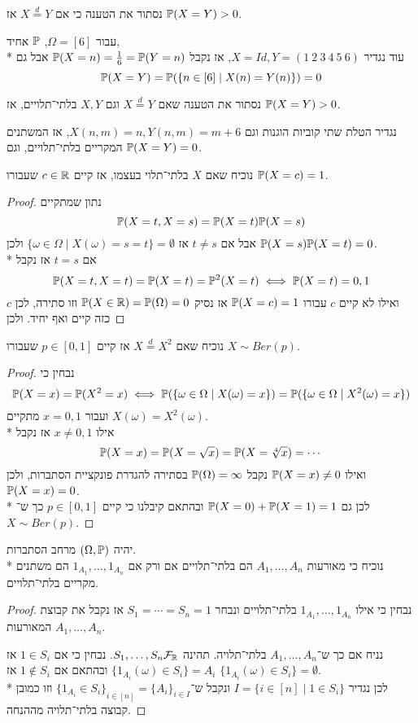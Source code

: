 \Subquestion{}
נסתור את הטענה כי אם $X \overset{d}{=} Y$ אז $\mathbb{P}(X = Y) > 0$.
\begin{solution}
	עבור $\Omega = [6]$, $\mathbb{P}$ אחיד, \\*
	עוד נגדיר $X = Id, Y = (1\ 2\ 3\ 4\ 5\ 6)$, אז נקבל $\mathbb{P}(X = n) = \frac{1}{6} = \mathbb{P}(Y = n)$ אבל גם
	\[
		\mathbb{P}(X = Y)
		= \mathbb{P}(\{n \in [6] \mid X(n) = Y(n)\})
		= 0
	\]
\end{solution}

\Subquestion{}
נסתור את הטענה שאם $X \overset{d}{=} Y$ וגם $X, Y$ בלתי־תלויים, אז $\mathbb{P}(X = Y) > 0$.
\begin{solution}
	נגדיר הטלת שתי קוביות הוגנות וגם $X(n, m) = n, Y(n, m) = m + 6$, אז המשתנים המקריים בלתי־תלויים, וגם $\mathbb{P}(X = Y) = 0$.
\end{solution}

\Subquestion{}
נוכיח שאם $X$ בלתי־תלוי בעצמו, אז קיים $c \in \mathbb{R}$ שעבורו $\mathbb{P}(X = c) = 1$.
\begin{proof}
	נתון שמתקיים
	\[
		\mathbb{P}(X = t, X = s) = \mathbb{P}(X = t) \mathbb{P}(X = s)
	\]
	אבל אם $t \ne s$ אז $\{ \omega \in \Omega \mid X(\omega) = s = t \} = \emptyset$ ולכן $\mathbb{P}(X = s) \mathbb{P}(X = t) = 0$. \\*
	אם $t = s$ אז נקבל
	\[
		\mathbb{P}(X = t, X = t) = \mathbb{P}(X = t) = \mathbb{P}^2(X = t)
		\iff
		\mathbb{P}(X = t) = 0, 1
	\]
	ואילו לא קיים $c$ עבורו $\mathbb{P}(X = c) = 1$ אז נסיק $\mathbb{P}(X \in \mathbb{R}) = \mathbb{P}(\Omega) = 0$ וזו סתירה, לכן $c$ כזה קיים ואף יחיד.
	ולכן 
\end{proof}

\Subquestion{}
נוכיח שאם $X \overset{d}{=} X^2$ אז קיים $p \in [0, 1]$ שעבורו $X \sim Ber(p)$.
\begin{proof}
	נבחין כי
	\[
		\mathbb{P}(X = x) = \mathbb{P}(X^2 = x)
		\iff
		\mathbb{P}(\{\omega \in \Omega \mid X(\omega) = x\}) = \mathbb{P}(\{\omega \in \Omega \mid X^2(\omega) = x\})
	\]
	ועבור $x = 0, 1$ מתקיים $X(\omega) = X^2(\omega)$. \\*
	אילו $x \ne 0, 1$ אז נקבל
	\[
		\mathbb{P}(X = x) = \mathbb{P}(X = \sqrt{x}) = \mathbb{P}(X = \sqrt[4]{x}) = \cdots
	\]
	ואילו $\mathbb{P}(X = x) \ne 0$ נקבל $\mathbb{P}(\Omega) = \infty$ בסתירה להגדרת פונקציית הסתברות, ולכן $\mathbb{P}(X = x) = 0$. \\*
	לכן גם $\mathbb{P}(X = 0) + \mathbb{P}(X = 1) = 1$ ובהתאם קיבלנו כי קיים $p \in [0, 1]$ כך ש־$X \sim Ber(p)$.
\end{proof}

\Question{}
יהיה $(\Omega, \mathbb{P})$ מרחב הסתברות. \\*
נוכיח כי מאורעות $A_1, \dots, A_n$ הם בלתי־תלויים אם ורק אם $1_{A_1}, \dots, 1_{A_n}$ הם משתנים מקריים בלתי־תלויים.
\begin{proof}
	נבחין כי אילו $1_{A_1}, \dots, 1_{A_n}$ בלתי־תלויים ונבחר $S_1 = \cdots = S_n = 1$ אז נקבל את קבוצת המאורעות $A_1, \dots, A_n$.

	נניח אם כך ש־$A_1, \dots, A_n$ בלתי־תלויה.
	תהינה $S_1, \dots, S_n \mathcal{F}_{\mathbb{R}}$. נבחין כי אם $1 \in S_i$ אז $\{ 1_{A_i}(\omega) \in S_i \} = A_i$ ובהתאם אם $1 \notin S_i$ אז $\{ 1_{A_i}(\omega) \in S_i \} = \emptyset$. \\*
	לכן נגדיר $I = \{ i \in [n] \mid 1 \in S_i \}$ ונקבל ש־${\{1_{A_i} \in S_i\}}_{i \in [n]} = {\{ A_i \}}_{i \in I}$ וזו כמובן קבוצה בלתי־תלויה מההנחה.
\end{proof}

